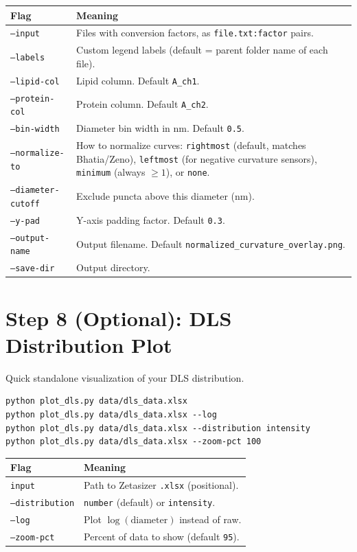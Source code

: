 \documentclass[11pt]{article}
\newcommand{\code}[1]{\texttt{#1}}
\newcommand{\flag}[1]{\texttt{#1}}
\begin{document}
\begin{tabularx}{\linewidth}{l X}
\toprule
\textbf{Flag} & \textbf{Meaning} \\
\midrule
\flag{--input}            & Files with conversion factors, as
                            \code{file.txt:factor} pairs. \\
\flag{--labels}           & Custom legend labels (default = parent
                            folder name of each file). \\
\flag{--lipid-col}        & Lipid column. Default \code{A\_ch1}. \\
\flag{--protein-col}      & Protein column. Default \code{A\_ch2}. \\
\flag{--bin-width}        & Diameter bin width in nm. Default \code{0.5}. \\
\flag{--normalize-to}     & How to normalize curves:
                            \code{rightmost} (default, matches
                            Bhatia/Zeno), \code{leftmost} (for
                            negative curvature sensors),
                            \code{minimum} (always $\geq 1$), or
                            \code{none}. \\
\flag{--diameter-cutoff}  & Exclude puncta above this diameter (nm). \\
\flag{--y-pad}            & Y-axis padding factor. Default \code{0.3}. \\
\flag{--output-name}      & Output filename. Default
                            \code{normalized\_curvature\_overlay.png}. \\
\flag{--save-dir}         & Output directory. \\
\bottomrule
\end{tabularx}

\section{Step 8 (Optional): DLS Distribution Plot}

Quick standalone visualization of your DLS distribution.

\begin{lstlisting}
python plot_dls.py data/dls_data.xlsx
python plot_dls.py data/dls_data.xlsx --log
python plot_dls.py data/dls_data.xlsx --distribution intensity
python plot_dls.py data/dls_data.xlsx --zoom-pct 100
\end{lstlisting}

\begin{tabularx}{\linewidth}{l X}
\toprule
\textbf{Flag} & \textbf{Meaning} \\
\midrule
\flag{input}            & Path to Zetasizer \code{.xlsx} (positional). \\
\flag{--distribution}   & \code{number} (default) or \code{intensity}. \\
\flag{--log}            & Plot $\log(\text{diameter})$ instead of raw. \\
\flag{--zoom-pct}       & Percent of data to show (default \code{95}). \\
\bottomrule
\end{tabularx}
\end{document}
